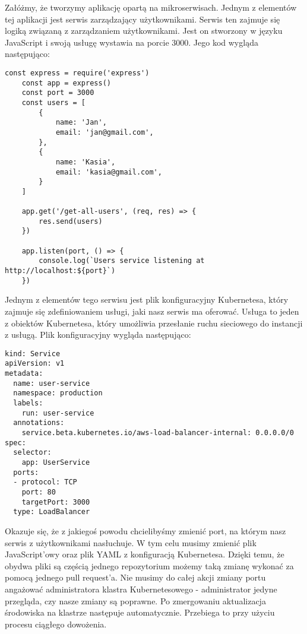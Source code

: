 \par
Załóżmy, że tworzymy aplikację opartą na mikroserwisach. Jednym z elementów tej aplikacji jest serwis zarządzający użytkownikami. Serwis ten zajmuje się logiką związaną z zarządzaniem użytkownikami. Jest on stworzony w języku JavaScript i swoją usługę wystawia na porcie 3000. Jego kod wygląda następująco:
\begin{lstlisting}[caption={Serwis zarządzający użytkownikami}]
    const express = require('express')
    const app = express()
    const port = 3000
    const users = [
        {
            name: 'Jan',
            email: 'jan@gmail.com',
        }, 
        {
            name: 'Kasia',
            email: 'kasia@gmail.com',
        }
    ]
    
    app.get('/get-all-users', (req, res) => {
        res.send(users)
    })
    
    app.listen(port, () => {
        console.log(`Users service listening at http://localhost:${port}`)
    })
\end{lstlisting}
Jednym z elementów tego serwisu jest plik konfiguracyjny Kubernetesa, który zajmuje się zdefiniowaniem usługi, jaki nasz serwis ma oferować. Usługa to jeden z obiektów Kubernetesa, który umożliwia przesłanie ruchu sieciowego do instancji z usługą. Plik konfiguracyjny wygląda następująco:
\begin{lstlisting}
kind: Service
apiVersion: v1
metadata:
  name: user-service
  namespace: production
  labels:
    run: user-service
  annotations:
    service.beta.kubernetes.io/aws-load-balancer-internal: 0.0.0.0/0
spec:
  selector:
    app: UserService
  ports:
  - protocol: TCP
    port: 80
    targetPort: 3000
  type: LoadBalancer
\end{lstlisting}
Okazuje się, że z jakiegoś powodu chcielibyśmy zmienić port, na którym nasz serwis z użytkownikami nasłuchuje. W tym celu musimy zmienić plik JavaScript'owy oraz plik YAML z konfiguracją Kubernetesa. Dzięki temu, że obydwa pliki są częścią jednego repozytorium możemy taką zmianę wykonać za pomocą jednego pull request'a. Nie musimy do całej akcji zmiany portu angażować administratora klastra Kubernetesowego - administrator jedyne przegląda, czy nasze zmiany są poprawne. Po zmergowaniu aktualizacja środowiska na klastrze następuje automatycznie. Przebiega to przy użyciu procesu ciągłego dowożenia.
